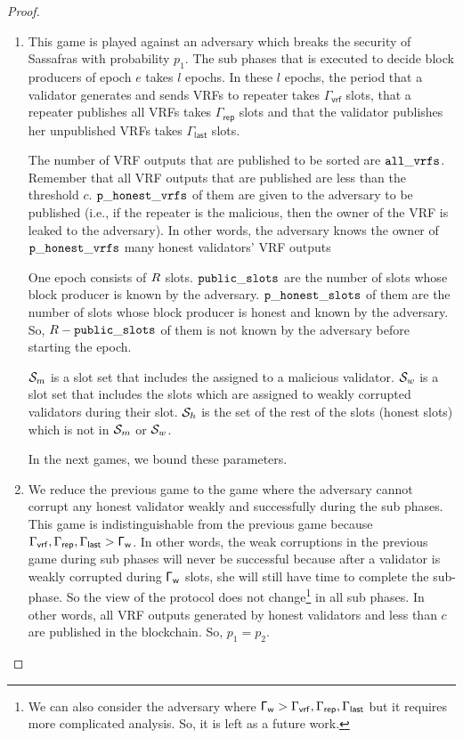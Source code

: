 \begin{proof}

\begin{enumerate}[label={{Game }}{{\arabic*}}]	
	\item This game is played against an adversary which breaks the security of  Sassafras with probability $ p_1 $. The sub phases that is executed to decide block producers of epoch $ e $ takes $ l $ epochs.	
	 In these $ l $ epochs, the period that a validator generates and sends VRFs to repeater takes $ \Gamma_{\mathsf{vrf}} $ slots, that a repeater publishes all VRFs takes $ \Gamma_{\mathsf{rep}} $ slots and that the validator publishes her unpublished VRFs takes $ \Gamma_{\mathsf{last}} $ slots. 
	 
	 
	
	 The number of VRF outputs that are published to be sorted are $ \mathtt{all\_vrfs} $. Remember that all VRF outputs that are published are less than the threshold $ c $. $ \mathtt{p\_honest\_vrfs} $ of them are given to the adversary to be published (i.e., if the repeater is the malicious, then the owner of the VRF is leaked to the adversary). In other words, the adversary knows the owner of $ \mathtt{p\_honest\_vrfs} $ many honest validators' VRF outputs
	 
	 One epoch consists of $ R  $ slots. $ \mathtt{public\_slots} $ are the number of slots whose block producer is known by the adversary. $ \mathtt{p\_honest\_slots} $ of them are the number of slots whose block producer is honest and known by the adversary. So, $ R  - \mathtt{public\_slots} $ of them is not known by the adversary before starting the epoch.
	 
	 $ \mathcal{S}_m $ is a slot set that includes the assigned to a malicious validator. $ \mathcal{S}_w $ is a slot set that includes the slots which are assigned to weakly corrupted validators during their slot. $ \mathcal{S}_h $ is the set of the rest of the slots (honest slots) which is not in $ \mathcal{S}_m $ or $ \mathcal{S}_w $. 
	  
	 In the next games, we bound these parameters.
	
	\item We reduce the previous game to the game where the adversary cannot corrupt  any honest validator weakly and successfully during the sub phases. This game is indistinguishable from the previous game  because $ \Gamma_{\mathsf{vrf}}, \Gamma_{\mathsf{rep}}, \Gamma_{\mathsf{last}}> \mathsf{\Gamma_{w}} $. In other words, the weak corruptions in the previous game during sub phases will never be successful because after a validator is weakly corrupted during $\mathsf{\Gamma_{w}} $ slots, she will still have time to complete the sub-phase. So the view of the protocol does not change\footnote{We can also consider the adversary where $ \mathsf{\Gamma_{w}} > \Gamma_{\mathsf{vrf}}, \Gamma_{\mathsf{rep}}, \Gamma_{\mathsf{last}} $ but it requires more complicated analysis. So, it is left as a future work.} in all sub phases. In other words, all VRF outputs generated by honest validators and less than $ c $ are published in the blockchain. So, $ p_1 = p_2 $.
	

\end{enumerate}
\end{proof}
